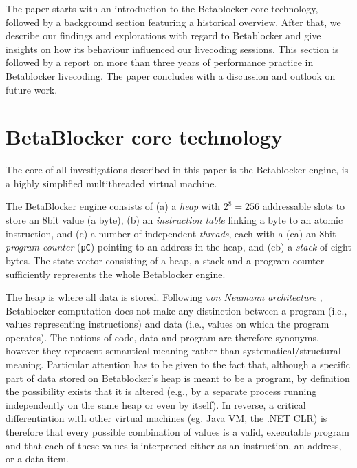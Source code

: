 \documentclass[letterpaper, 12pt]{article}
\begin{document}
The paper starts with an introduction to the Betablocker core technology, followed by a background section featuring a historical overview.
After that, we describe our findings and explorations with regard to Betablocker  and give insights on how its behaviour influenced our livecoding sessions.
This section is followed by a report on more than three years of performance practice in Betablocker livecoding.
The paper concludes with a discussion and outlook on future work.

\section{BetaBlocker core technology} 
\label{sec:betablocker_core}


The core of all investigations described in this paper is the Betablocker engine, is a highly simplified multithreaded virtual machine.

The BetaBlocker engine consists of 
(a) a \emph{heap} with  $2^8 = 256$ addressable slots to store an 8bit value (a byte), 
(b) an \emph{instruction table} linking a byte to an atomic instruction, and
(c) a number of independent \emph{threads}, each with a 
	(ca) an 8bit \emph{program counter} (\texttt{pC}) pointing to an address in the heap, and (cb) a \emph{stack} of eight bytes.
The state vector consisting of a heap, a stack and a program counter sufficiently represents the whole Betablocker engine.

The heap is where all data is stored. 
Following \emph{von Neumann architecture} \citep*{von-neumann1993-fir}, Betablocker computation does not make any distinction between a program (i.e., values representing instructions) and data (i.e., values on which the program operates). 
The notions of code, data and program are therefore synonyms, however they represent semantical meaning rather than systematical/structural meaning.
Particular attention has to be given to the fact that, although a specific part of data stored on Betablocker's heap is meant to be a program, by definition the possibility exists that it is altered (e.g., by a separate process running independently on the same heap or even by itself).
In reverse, a critical differentiation with other virtual machines (eg. Java VM, the .NET CLR) is therefore that every possible combination of values is a valid, executable program and that each of these values is interpreted either as an instruction, an address, or a data item. 
\end{document}
